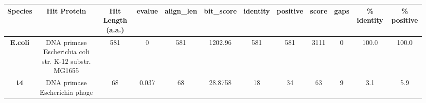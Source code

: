 \begin{tabular}{|c|c|c|c|c|c|c|c|c|c|c|c|} \hline
\textbf{Species} & \textbf{Hit Protein} & \textbf{Hit Length (a.a.)} & \textbf{evalue} & \textbf{align\_len} & \textbf{bit\_score} & \textbf{identity} & \textbf{positive} & \textbf{score} & \textbf{gaps} & \textbf{\% identity} & \textbf{\% positive} \\ \hline
\textbf{E.coli} & DNA primase Escherichia coli str. K-12 substr. MG1655 & 581 & 0 & 581 & 1202.96 & 581 & 581 & 3111 & 0 & 100.0 & 100.0\\
\textbf{t4} & DNA primase Escherichia phage  & 68 & 0.037 & 68 & 28.8758 & 18 & 34 & 63 & 9 & 3.1 & 5.9\\
\hline \end{tabular}
